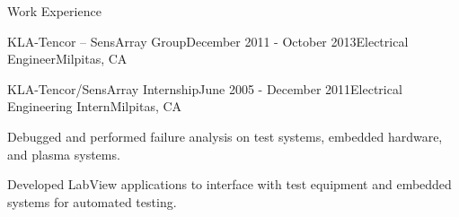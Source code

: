 \documentclass{resume} %
\begin{document}
\begin{rSection}{Work Experience}
\begin{rSubsection2}{KLA-Tencor -- SensArray Group}{December 2011 - October 2013}{Electrical Engineer}{Milpitas, CA}



\end{rSubsection2}

\pagebreak[2]
\begin{rSubsection}{KLA-Tencor/SensArray Internship}{June 2005 - December 2011}{Electrical Engineering Intern}{Milpitas, CA}
\item Debugged and performed failure analysis on test systems, embedded hardware, and plasma systems.
\item Developed LabView applications to interface with test equipment and embedded systems for automated testing.
\end{rSubsection}
\end{rSection}
\end{document}
